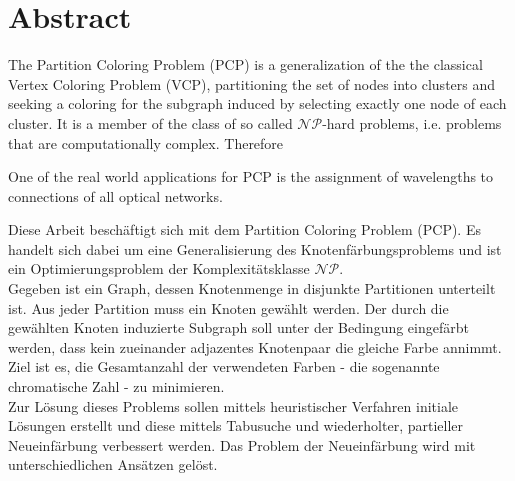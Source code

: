 \chapter*{Abstract}

The Partition Coloring Problem (PCP) is a generalization of the the classical Vertex Coloring Problem (VCP), partitioning the set of nodes into clusters and seeking a coloring for the subgraph induced by selecting exactly one node of each cluster. It is a member of the class of so called $\mathcal{NP}$-hard problems, i.e. problems that are computationally complex. Therefore

One of the real world applications for PCP is the assignment of wavelengths to connections of all optical networks.


Diese Arbeit beschäftigt sich mit dem Partition Coloring Problem (PCP). Es handelt sich dabei um eine Generalisierung des Knotenfärbungsproblems und ist ein Optimierungsproblem der Komplexitätsklasse $\mathcal{NP}$.\\
Gegeben ist ein Graph, dessen Knotenmenge in disjunkte Partitionen unterteilt ist. Aus jeder Partition muss ein Knoten gewählt werden. Der durch die gewählten Knoten induzierte Subgraph soll unter der Bedingung eingefärbt werden, dass kein zueinander adjazentes Knotenpaar die gleiche Farbe annimmt. Ziel ist es, die Gesamtanzahl der verwendeten Farben - die sogenannte chromatische Zahl - zu minimieren.\\
Zur Lösung dieses Problems sollen mittels heuristischer Verfahren initiale Lösun\-gen erstellt und diese mittels Tabusuche und wiederholter, partieller Neueinfär\-bung verbessert werden. Das Problem der Neueinfärbung wird mit unterschiedlichen Ansätzen gelöst. 
